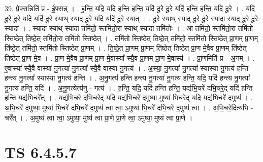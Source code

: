 \documentclass[17pt]{extarticle}
\begin{document}
39. प्रे॒फ्सन्निति॑ प्र - ई॒फ्सन्न् । . ह॒न्ति॒ यदि॒ यदि॑ हन्ति हन्ति॒ यदि॑ दू॒रे दू॒रे यदि॑ हन्ति हन्ति॒ यदि॑ दू॒रे । . यदि॑ दू॒रे दू॒रे यदि॒ यदि॑ दू॒रे स्याथ् स्याद् दू॒रे यदि॒ यदि॑ दू॒रे स्यात् । . दू॒रे स्याथ् स्याद् दू॒रे दू॒रे स्यादा स्याद् दू॒रे दू॒रे स्यादा । . स्यादा स्याथ् स्यादा तमि॑तो॒ स्तमि॑तो॒रा स्याथ् स्यादा तमि॑तोः । . आ तमि॑तो॒ स्तमि॑तो॒रा तमि॑तो स्तिष्ठेत् तिष्ठे॒त् तमि॑तो॒रा तमि॑तो स्तिष्ठेत् । . तमि॑तो स्तिष्ठेत् तिष्ठे॒त् तमि॑तो॒ स्तमि॑तो स्तिष्ठेत् प्रा॒णम् प्रा॒णम् ति॑ष्ठे॒त् तमि॑तो॒ स्तमि॑तो स्तिष्ठेत् प्रा॒णम् । . ति॒ष्ठे॒त् प्रा॒णम् प्रा॒णम् ति॑ष्ठेत् तिष्ठेत् प्रा॒ण मे॒वैव प्रा॒णम् ति॑ष्ठेत् तिष्ठेत् प्रा॒ण मे॒व । . प्रा॒ण मे॒वैव प्रा॒णम् प्रा॒ण मे॒वास्या᳚ स्यै॒व प्रा॒णम् प्रा॒ण मे॒वास्य॑ । . प्रा॒णमिति॑ प्र - अ॒नम् । . ए॒वास्या᳚ स्यै॒वै वास्या॑ नु॒गत्या॑ नु॒गत्या᳚ स्यै॒वै वास्या॑ नु॒गत्य॑ । . अ॒स्या॒ नु॒गत्या॑ नु॒गत्या᳚ स्यास्या नु॒गत्य॑ हन्ति हन्त्य नु॒गत्या᳚ स्यास्या नु॒गत्य॑ हन्ति । . अ॒नु॒गत्य॑ हन्ति हन्त्य नु॒गत्या॑ नु॒गत्य॑ हन्ति॒ यदि॒ यदि॑ हन्त्य नु॒गत्या॑ नु॒गत्य॑ हन्ति॒ यदि॑ । . अ॒नु॒गत्येत्य॑नु - गत्य॑ । . ह॒न्ति॒ यदि॒ यदि॑ हन्ति हन्ति॒ यद्य॑भि॒चरे॑ दभि॒चरे॒द् यदि॑ हन्ति हन्ति॒ यद्य॑भि॒चरे᳚त् । . यद्य॑भि॒चरे॑ दभि॒चरे॒द् यदि॒ यद्य॑भि॒चरे॑ द॒मुष्या॒ मुष्या॑ भि॒चरे॒द् यदि॒ यद्य॑भि॒चरे॑ द॒मुष्य॑ । . अ॒भि॒चरे॑ द॒मुष्या॒ मुष्या॑ भि॒चरे॑ दभि॒चरे॑ द॒मुष्य॑ त्वा त्वा॒ ऽमुष्या॑ भि॒चरे॑ दभि॒चरे॑ द॒मुष्य॑ त्वा । . अ॒भि॒चरे॒दित्य॑भि - चरे᳚त् । . अ॒मुष्य॑ त्वा त्वा॒ ऽमुष्या॒ मुष्य॑ त्वा प्रा॒णे प्रा॒णे त्वा॒ ऽमुष्या॒ मुष्य॑ त्वा प्रा॒णे । \newline
\pagebreak
{}

\section{ TS 6.4.5.7 }
\end{document}
